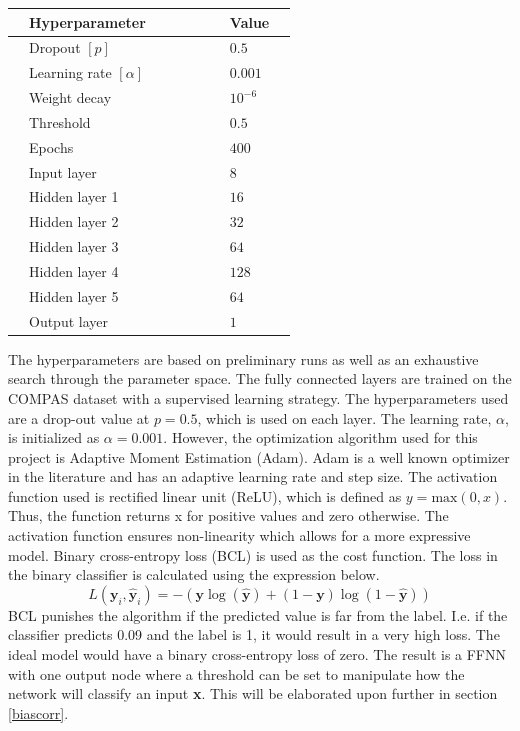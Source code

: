 \documentclass[11pt, fleqn, titlepage]{article}
\begin{document}
	\begin{table}[H]
		\centering
		\begin{tabular}{l l l l l l l l l}
			\toprule
			& Hyperparameter           &&&&& & Value    & \\ \midrule
			& Dropout $[p]$            &&&&& & $0.5$    & \\ 
			& Learning rate $[\alpha]$ &&&&& & $0.001$  & \\ 
			& Weight decay             &&&&& & $10^{-6}$& \\ 
			& Threshold                &&&&& & $0.5$    & \\ 
			& Epochs                   &&&&& & $400$    & \\ 
			& Input layer              &&&&& & $8$      & \\ 
			& Hidden layer 1           &&&&& & $16$     & \\ 
			& Hidden layer 2           &&&&& & $32$     & \\ 
			& Hidden layer 3           &&&&& & $64$     & \\ 
			& Hidden layer 4           &&&&& & $128$    & \\ 
			& Hidden layer 5           &&&&& & $64$     & \\ 
			& Output layer             &&&&& & $1$      & \\ \bottomrule
		\end{tabular}
	\end{table}
	\noindent
	The hyperparameters are based on preliminary runs as well as an exhaustive search through the parameter space. The fully connected layers are trained on the COMPAS dataset with a supervised learning strategy. The hyperparameters used are a drop-out value at $p=0.5$, which is used on each layer. The learning rate, $\alpha$, is initialized as $\alpha = 0.001$. However, the optimization algorithm used for this project is Adaptive Moment Estimation (Adam). Adam is a well known optimizer in the literature and has an adaptive learning rate and step size. The activation function used is rectified linear unit (ReLU), which is defined as $ y = \text{max}(0,x) $. Thus, the function returns x for positive values and zero otherwise. The activation function ensures non-linearity which allows for a more expressive model. Binary cross-entropy loss (BCL) is used as the cost function. The loss in the binary classifier is calculated using the expression below. 
	\begin{equation}\label{key}
	L\left(\boldsymbol{y}_{i}, \hat{\boldsymbol{y}}_{i}\right) = -(\mathbf y \log (\mathbf {\hat y})+(1-\mathbf  y) \log (1-\mathbf {\hat y}))
	\end{equation}
	BCL punishes the algorithm if the predicted value is far from the label. I.e. if the classifier predicts 0.09 and the label is 1, it would result in a very high loss. The ideal model would have a binary cross-entropy loss of zero. \cite {dl} The result is a FFNN with one output node where a threshold can be set to manipulate how the network will classify an input \textbf{x}. This will be elaborated upon further in section \ref{biascorr}.
\end{document}
